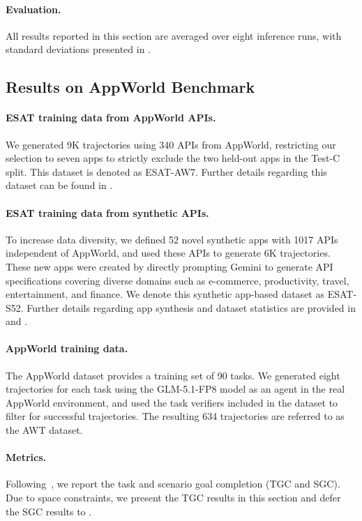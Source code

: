 \paragraph{Evaluation.} All results reported in this section are averaged over eight inference runs, with standard deviations presented in .

\subsection{Results on AppWorld Benchmark}
\paragraph{\textsc{ESAT} training data from AppWorld APIs.} We generated 9K trajectories using 340 APIs from AppWorld, restricting our selection to seven apps to strictly exclude the two held-out apps in the Test-C split. This dataset is denoted as \textsc{ESAT}-AW7. Further details regarding this dataset can be found in .

\paragraph{\textsc{ESAT} training data from synthetic APIs.} To increase data diversity, we defined 52 novel synthetic apps with 1017 APIs independent of AppWorld, and used these APIs to generate 6K trajectories. These new apps were created by directly prompting Gemini to generate API specifications covering diverse domains such as e-commerce, productivity, travel, entertainment, and finance. We denote this synthetic app-based dataset as \textsc{ESAT}-S52. Further details regarding app synthesis and dataset statistics are provided in  and . 



\paragraph{AppWorld training data.} The AppWorld dataset provides a training set of 90 tasks. We generated eight trajectories for each task using the GLM-5.1-FP8 model as an agent in the real AppWorld environment, and used the task verifiers included in the dataset to filter for successful trajectories. The resulting 634 trajectories are referred to as the AWT dataset.



\paragraph{Metrics.} Following~\citet{appworld}, we report the task and scenario goal completion (TGC and SGC). Due to space constraints, we present the TGC results in this section and defer the SGC results to .

